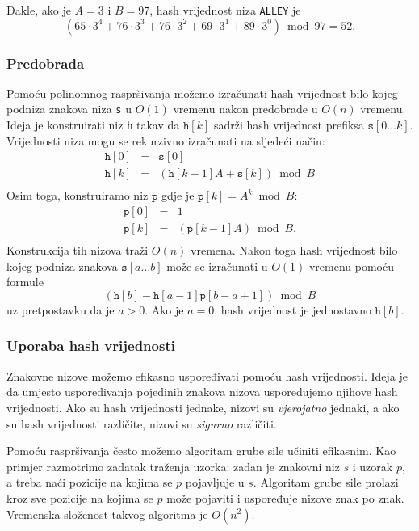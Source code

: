 Dakle, ako je $A=3$ i $B=97$, hash vrijednost
niza \texttt{ALLEY} je
\[(65 \cdot 3^4 + 76 \cdot 3^3 + 76 \cdot 3^2 + 69 \cdot 3^1 + 89 \cdot 3^0) \bmod 97 = 52.\]

\subsubsection*{Predobrada}

Pomoću polinomnog raspršivanja možemo izračunati hash vrijednost bilo kojeg
podniza znakova niza \texttt{s} u $O(1)$ vremenu nakon predobrade u $O(n)$ vremenu.
Ideja je konstruirati niz \texttt{h} takav da
$\texttt{h}[k]$ sadrži hash vrijednost prefiksa $\texttt{s}[0 \ldots k]$.
Vrijednosti niza mogu se rekurzivno izračunati na sljedeći način:
\[
\begin{array}{lcl}
\texttt{h}[0] & = & \texttt{s}[0] \\
\texttt{h}[k] & = & (\texttt{h}[k-1] A + \texttt{s}[k]) \bmod B \\
\end{array}
\]
Osim toga, konstruiramo niz $\texttt{p}$
gdje je $\texttt{p}[k]=A^k \bmod B$:
\[
\begin{array}{lcl}
\texttt{p}[0] & = & 1 \\
\texttt{p}[k] & = & (\texttt{p}[k-1] A) \bmod B. \\
\end{array}
\]
Konstrukcija tih nizova traži $O(n)$ vremena.
Nakon toga hash vrijednost bilo kojeg podniza znakova
$\texttt{s}[a \ldots b]$
može se izračunati u $O(1)$ vremenu pomoću formule
\[(\texttt{h}[b]-\texttt{h}[a-1] \texttt{p}[b-a+1]) \bmod B\]
uz pretpostavku da je $a>0$.
Ako je $a=0$, hash vrijednost je jednostavno $\texttt{h}[b]$.

\subsubsection*{Uporaba hash vrijednosti}

Znakovne nizove možemo efikasno uspoređivati pomoću hash vrijednosti.
Ideja je da umjesto uspoređivanja pojedinih znakova nizova
uspoređujemo njihove hash vrijednosti.
Ako su hash vrijednosti jednake,
nizovi su \emph{vjerojatno} jednaki,
a ako su hash vrijednosti različite,
nizovi su \emph{sigurno} različiti.

Pomoću raspršivanja često možemo algoritam grube sile
učiniti efikasnim.
Kao primjer razmotrimo zadatak traženja uzorka:
zadan je znakovni niz $s$ i uzorak $p$,
a treba naći pozicije na kojima se $p$ pojavljuje u $s$.
Algoritam grube sile prolazi kroz sve pozicije
na kojima se $p$ može pojaviti i uspoređuje nizove
znak po znak.
Vremenska složenost takvog algoritma je $O(n^2)$.

